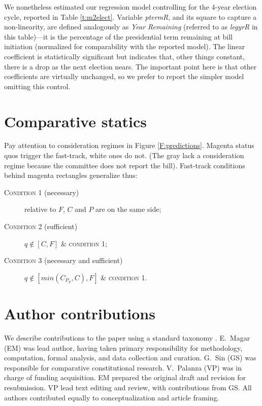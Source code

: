 \documentclass[letter,12pt]{article}
\begin{document}
We nonetheless estimated our regression model controlling for the 4-year election cycle, reported in Table \ref{t:m2elect}. Variable \emph{ptermR}, and its square to capture a non-linearity, are defined analogously as \emph{Year Remaining} (referred to as \emph{legyrR} in this table)---it is the percentage of the presidential term remaining at bill initiation (normalized for comparability with the reported model). The linear coefficient is statistically significant but indicates that, other things constant, there is a drop as the next election nears. The important point here is that other coefficients are virtually unchanged, so we prefer to report the simpler model omitting this control. 

\section{Comparative statics}

Pay attention to consideration regimes in Figure \ref{F:predictions}. Magenta status quos trigger the fast-track, white ones do not. (The gray lack a consideration regime because the committee does not report the bill). Fast-track conditions behind magenta rectangles generalize thus:  

\begin{description}
\item[\textsc{Condition 1} (necessary)] relative to $F$, $C$ and $P$ are on the same side; 
\item[\textsc{Condition 2} (sufficient)]  $q \notin [C,F]$ \& \textsc{condition 1};
\item[\textsc{Condition 3} (necessary and sufficient)] $q \notin [min(C_{P_F},C),F]$ \& \textsc{condition 1}.
\end{description}

\section{Author contributions}

We describe contributions to the paper using a standard taxonomy \citep{allen2014credit}. E.\ Magar (EM) was lead author, having taken primary responsibility for methodology, computation, formal analysis, and data collection and curation. G.\ Sin (GS) was responsible for comparative constitutional research. V.\ Palanza (VP) was in charge of funding acquisition. EM prepared the original draft and revision for resubmission. VP lead text editing and review, with contributions from GS. All authors contributed equally to conceptualization and article framing. 
\end{document}
